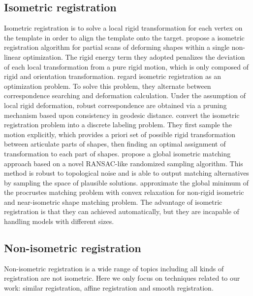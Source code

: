\subsection{Isometric registration}
Isometric registration is to solve a local rigid transformation for each vertex on the template in order to align the template onto the target. \cite{li2008global} propose a isometric registration algorithm for partial scans of deforming shapes within a single non-linear optimization. The rigid energy term they adopted penalizes the deviation of each local transformation from a pure rigid motion, which is only composed of rigid and orientation transformation. \cite{qixing2008non} regard isometric registration as an optimization problem. To solve this problem, they alternate between correspondence searching and deformation calculation. Under the assumption of local rigid deformation, robust correspondence are obtained via a pruning mechanism based upon consistency in geodesic distance. \cite{chang2008automatic} convert the isometric registration problem into a discrete labeling problem. They first sample the motion explicitly, which provides a priori set of possible rigid transformation between articulate parts of shapes, then finding an optimal assignment of transformation to each part of shapes. \cite{tevs2009isometric} propose a global isometric matching approach based on a novel RANSAC-like randomized sampling algorithm. This method is robust to topological noise and is able to output matching alternatives by sampling the space of plausible solutions. \cite{maron2016point} approximate the global minimum of the procrustes matching problem with convex relaxation for non-rigid isometric and near-isometric shape matching problem. The advantage of isometric registration is that they can achieved automatically, but they are incapable of handling models with different sizes.

\subsection{Non-isometric registration}
Non-isometric registration is a wide range of topics including all kinds of registration are not isometric. Here we only focus on techniques related to our work: similar registration, affine registration and smooth registration.

